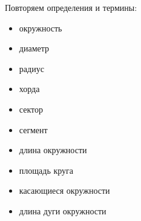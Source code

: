 \documentclass[geometry,a5paper]{pum}
\date{\today}
\begin{document}
%
%

Повторяем определения и термины:
\begin{itemize}
  \item окружность
  \item диаметр
  \item радиус
  \item хорда
  \item сектор
  \item сегмент
  \item длина окружности
  \item площадь круга
  \item касающиеся окружности
  \item длина дуги окружности
\end{itemize}
\end{document}
